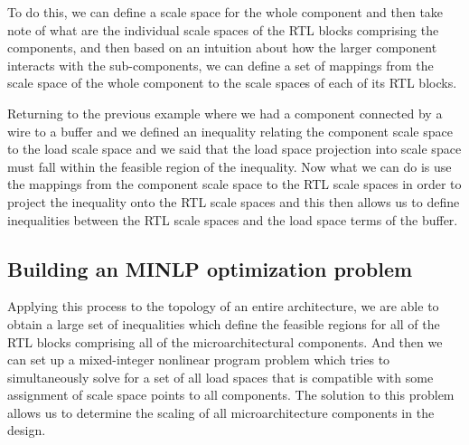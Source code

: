 To do this, we can define a scale space for the whole component and then take note of what are the individual scale spaces of the RTL blocks comprising the components, and then based on an intuition about how the larger component interacts with the sub-components, we can define a set of mappings from the scale space of the whole component to the scale spaces of each of its RTL blocks.

Returning to the previous example where we had a component connected by a wire to a buffer and we defined an inequality relating the component scale space to the load scale space and we said that the load space projection into scale space must fall within the feasible region of the inequality. Now what we can do is use the mappings from the component scale space to the RTL scale spaces in order to project the inequality onto the RTL scale spaces and this then allows us to define inequalities between the RTL scale spaces and the load space terms of the buffer.

\subsection{Building an MINLP optimization problem}

Applying this process to the topology of an entire architecture, we are able to obtain a large set of inequalities which define the feasible regions for all of the RTL blocks comprising all of the microarchitectural components. And then we can set up a mixed-integer nonlinear program problem which tries to simultaneously solve for a set of all load spaces that is compatible with some assignment of scale space points to all components. The solution to this problem allows us to determine the scaling of all microarchitecture components in the design.
